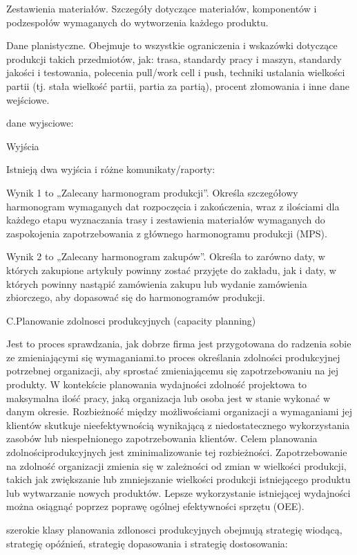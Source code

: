      Zestawienia materiałów. Szczegóły dotyczące materiałów, komponentów i podzespołów wymaganych do wytworzenia każdego produktu.
     
     Dane planistyczne. Obejmuje to wszystkie ograniczenia i wskazówki dotyczące produkcji takich przedmiotów, jak: trasa, standardy pracy i maszyn, standardy jakości i testowania, polecenia pull/work cell i push, techniki ustalania wielkości partii (tj. stała wielkość partii, partia za partią), procent złomowania i inne dane wejściowe.

     dane wyjsciowe:

     Wyjścia

Istnieją dwa wyjścia i różne komunikaty/raporty:

     Wynik 1 to „Zalecany harmonogram produkcji”. Określa szczegółowy harmonogram wymaganych dat rozpoczęcia i zakończenia, wraz z ilościami dla każdego etapu wyznaczania trasy i zestawienia materiałów wymaganych do zaspokojenia zapotrzebowania z głównego harmonogramu produkcji (MPS).
     
     Wynik 2 to „Zalecany harmonogram zakupów”. Określa to zarówno daty, w których zakupione artykuły powinny zostać przyjęte do zakładu, jak i daty, w których powinny nastąpić zamówienia zakupu lub wydanie zamówienia zbiorczego, aby dopasować się do harmonogramów produkcji.


     C.Planowanie zdolnosci produkcyjnych (capacity planning)

Jest to proces sprawdzania, jak dobrze firma jest przygotowana do radzenia sobie ze zmieniającymi się wymaganiami.to proces określania zdolności produkcyjnej potrzebnej organizacji, aby sprostać zmieniającemu się zapotrzebowaniu na jej produkty. W kontekście planowania wydajności zdolność projektowa to maksymalna ilość pracy, jaką organizacja lub osoba jest w stanie wykonać w danym okresie. Rozbieżność między możliwościami organizacji a wymaganiami jej klientów skutkuje nieefektywnością wynikającą z niedostatecznego wykorzystania zasobów lub niespełnionego zapotrzebowania klientów. Celem planowania zdolnościprodukcyjnych jest zminimalizowanie tej rozbieżności. Zapotrzebowanie na zdolność organizacji zmienia się w zależności od zmian w wielkości produkcji, takich jak zwiększanie lub zmniejszanie wielkości produkcji istniejącego produktu lub wytwarzanie nowych produktów. Lepsze wykorzystanie istniejącej wydajności można osiągnąć poprzez poprawę ogólnej efektywności sprzętu (OEE). 

 szerokie klasy planowania zdlonosci produkcyjnych obejmują strategię wiodącą, strategię opóźnień, strategię dopasowania i strategię dostosowania:

